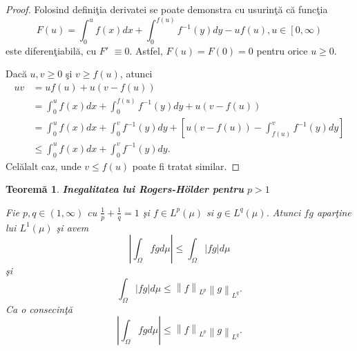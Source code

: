 \documentclass[a4paper,12pt,oneside]{report}
\newtheorem{theorem}{Teorem\u a}
\begin{document}
\begin{proof}
Folosind defini\c{t}ia derivatei se poate demonstra cu usurin\c{t}\u{a} c\u{a} func\c{t}ia
\begin{displaymath}
  F\left ( u \right )= \int_{0}^{u}f\left ( x \right )dx + \int_{0}^{f\left ( u \right )}f^{-1}\left ( y \right )dy -uf\left ( u \right ), u \in \left [ 0,\infty  \right )
\end{displaymath}
este diferen\c{t}iabil\u{a}, cu \({F}'\) $\equiv 0.$ Astfel, \(F\left ( u \right )= F\left ( 0 \right )= 0\) pentru orice \(u\geq 0\).
  
Dac\u{a} \(u, v \geq 0\)  \c{s}i \(v\geq f\left ( u \right )\), atunci
\begin{equation} \nonumber
    \begin{split}
       uv & =  uf\left ( u \right )+ u\left ( v- f\left ( u \right ) \right ) \\ &  =  \int_{0}^{u}f\left ( x \right )dx + \int_{0}^{f\left ( u \right )}f^{-1}\left ( y \right )dy + u\left ( v - f\left ( u \right ) \right ) \\ &  = \int_{0}^{u}f\left ( x \right )dx + \int_{0}^{v}f^{-1}\left ( y \right )dy + \left [ u\left ( v-f\left ( u \right )  \right ) - \int_{f\left ( u \right )}^{v}f^{-1}\left ( y \right )dy\right ] \\ &  \leq \int_{0}^{u}f\left ( x \right )dx + \int_{0}^{v}f^{-1}\left ( y \right )dy.
    \end{split}
\end{equation}
Cel\u{a}lalt caz, unde \(v\leq f\left ( u \right )\) poate fi tratat similar.
\end{proof}

\begin{theorem}

\textbf{Inegalitatea lui Rogers-Hölder pentru} \(p > 1\)

Fie \(p,q \in \left ( 1, \infty  \right )\) cu \(\frac{1}{p} + \frac{1}{q} = 1\) \c{s}i  \(f\in L^{p}\left ( \mu  \right )\) si \(g\in L^{q}\left ( \mu  \right )\). Atunci \(fg\) apar\c{t}ine lui \(L^{1}\left ( \mu  \right )\) \c{s}i avem
\begin{displaymath}
  \left | \int_{\Omega}^{} fg  d\mu \right |\leq \int_{\Omega}^{}\left | fg \right |d\mu \label{eq:1.5} \tag{1.5}
\end{displaymath}
\c{s}i
\begin{displaymath}
  \int_{\Omega}^{}\left | fg \right |d\mu \leq \left \| f \right \|_{L^{p}}\left \| g \right \|_{{L}^{q}}. \label{eq:1.6} \tag{1.6}
\end{displaymath}
Ca o consecin\c{t}\u{a}
\begin{displaymath}
  \left | \int_{\Omega}^{} fg  d\mu \right |\leq \left \| f \right \|_{L^{p}}\left \| g \right \|_{{L}^{q}}. \label{eq:1.7} \tag{1.7}
\end{displaymath}
\end{theorem}
\end{document}
